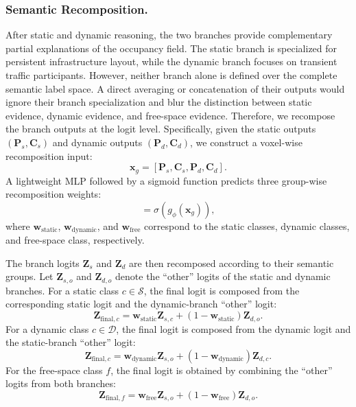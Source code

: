 \subsubsection{Semantic Recomposition.}
\label{sec:prosd_semantic_recomposition}
After static and dynamic reasoning, the two branches provide complementary
partial explanations of the occupancy field. The static branch is specialized
for persistent infrastructure layout, while the dynamic branch focuses on
transient traffic participants. However, neither branch alone is defined over
the complete semantic label space. A direct averaging or concatenation of their
outputs would ignore their branch specialization and blur the distinction
between static evidence, dynamic evidence, and free-space evidence. Therefore,
we recompose the branch outputs at the logit level.
Specifically, given the static outputs $(\bm{P}_{s},\bm{C}_{s})$ and dynamic
outputs $(\bm{P}_{d},\bm{C}_{d})$, we construct a voxel-wise recomposition
input:
\begin{equation}
  \bm{x}_{g}
  =
  [\bm{P}_{s},\bm{C}_{s},\bm{P}_{d},\bm{C}_{d}].
\end{equation}
A lightweight MLP followed by a sigmoid function predicts three group-wise
recomposition weights:
\begin{equation}
  [\bm{w}_{\mathrm{static}},\bm{w}_{\mathrm{dynamic}},\bm{w}_{\mathrm{free}}]
  =
  \sigma(g_{\phi}(\bm{x}_{g})),
\end{equation}
where $\bm{w}_{\mathrm{static}}$, $\bm{w}_{\mathrm{dynamic}}$, and
$\bm{w}_{\mathrm{free}}$ correspond to
the static classes, dynamic classes, and free-space class, respectively.

The branch logits $\bm{Z}_{s}$ and $\bm{Z}_{d}$ are then recomposed according to
their semantic groups. Let $\bm{Z}_{s,o}$ and $\bm{Z}_{d,o}$ denote the
``other'' logits of the static and dynamic branches. For a static class
$c\in\mathcal{S}$, the final logit is composed from the corresponding static
logit and the dynamic-branch ``other'' logit:
\begin{equation}
  \bm{Z}_{\mathrm{final},c}
  =
  \bm{w}_{\mathrm{static}}\bm{Z}_{s,c}
  +(1-\bm{w}_{\mathrm{static}})\bm{Z}_{d,o}.
\end{equation}
For a dynamic class $c\in\mathcal{D}$, the final logit is composed from the
dynamic logit and the static-branch ``other'' logit:
\begin{equation}
  \bm{Z}_{\mathrm{final},c}
  =
  \bm{w}_{\mathrm{dynamic}}\bm{Z}_{s,o}
  +(1-\bm{w}_{\mathrm{dynamic}})\bm{Z}_{d,c}.
\end{equation}
For the free-space class $f$, the final logit is obtained by combining the
``other'' logits from both branches:
\begin{equation}
  \bm{Z}_{\mathrm{final},f}
  =
  \bm{w}_{\mathrm{free}}\bm{Z}_{s,o}
  +(1-\bm{w}_{\mathrm{free}})\bm{Z}_{d,o}.
\end{equation}

